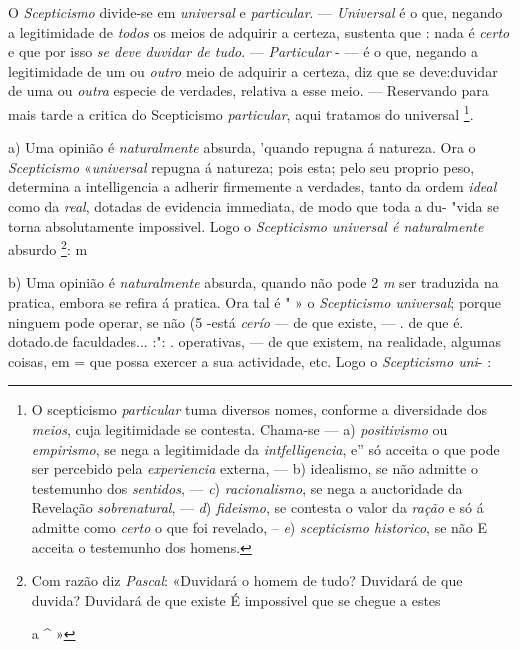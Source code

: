 
 
O \emph{Scepticismo} divide-se em \emph{universal} e \emph{particular}. --- \emph{Universal} é o que, negando a legitimidade de \emph{todos} os meios de adquirir a certeza, sustenta que : nada é \emph{certo} e que por isso \emph{se deve duvidar de tudo}. --- \emph{Particular} - --- é o que, negando a legitimidade de um ou \emph{outro} meio de adquirir a certeza, diz que se deve:duvidar de uma ou \emph{outra} especie de verdades, relativa a esse meio. --- Reservando para mais tarde a critica do Scepticismo \emph{particular}, aqui tratamos do universal \footnote{O scepticismo \emph{particular} tuma diversos nomes, conforme a diversidade dos \emph{meios}, cuja legitimidade se contesta. Chama-se --- a) \emph{positivismo} ou \emph{empirismo}, se nega a legitimidade da \emph{intfelligencia}, e” só acceita o que pode ser percebido pela \emph{experiencia} externa, --- b) idealismo, se não admitte o testemunho dos \emph{sentidos}, --- \emph{c}) \emph{racionalismo}, se nega a auctoridade da Revelação \emph{sobrenatural}, --- \emph{d}) \emph{fideismo}, se contesta o valor da \emph{ração} e só á admitte como \emph{certo} o que foi revelado, -- \emph{e}) \emph{scepticismo historico}, se não E acceita o testemunho dos homens.}.



a) Uma opinião é \emph{naturalmente} absurda, 'quando repugna á natureza. Ora o \emph{Scepticismo} «\emph{universal} repugna á natureza; pois esta; pelo seu proprio peso, determina a intelligencia a adherir firmemente a verdades, tanto da ordem \emph{ideal} como da \emph{real}, dotadas de evidencia immediata, de modo que toda a du- "vida se torna absolutamente impossivel. Logo o \emph{Scepticismo universal é naturalmente} absurdo \footnote{Com razão diz \emph{Pascal}: «Duvidará o homem de tudo? Duvidará de que duvida? Duvidará de que existe É impossivel que se chegue a estes\par a \textasciicircum{} »}: m

b) Uma opinião é \emph{naturalmente} absurda, quando não pode 2 \emph{m} ser traduzida na pratica, embora se refira á pratica. Ora tal é " » o \emph{Scepticismo universal}; porque ninguem pode operar, se não (5 -está \emph{cerío} --- de que existe, --- . de que é. dotado.de faculdades... :": . operativas, --- de que existem, na realidade, algumas coisas, em \textbar{} = que possa exercer a sua actividade, etc. Logo o \emph{Scepticismo uni}- : \textbar{}

